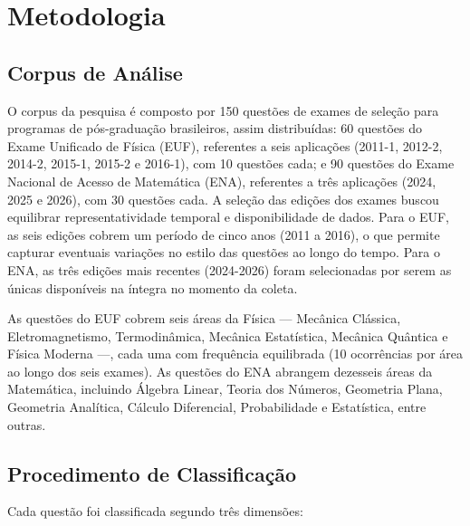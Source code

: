 \documentclass[
  12pt,
  a4paper,
  twoside,
  brazilian
]{article}
\begin{document}
\newpage
\section{Metodologia}\label{metodologia}

\subsection{Corpus de Análise}\label{corpus-de-anuxe1lise}

O corpus da pesquisa é composto por 150 questões de exames de seleção
para programas de pós-graduação brasileiros, assim distribuídas: 60
questões do Exame Unificado de Física (EUF), referentes a seis
aplicações (2011-1, 2012-2, 2014-2, 2015-1, 2015-2 e 2016-1), com 10
questões cada; e 90 questões do Exame Nacional de Acesso de Matemática
(ENA), referentes a três aplicações (2024, 2025 e 2026), com 30 questões
cada. A seleção das edições dos exames buscou equilibrar
representatividade temporal e disponibilidade de dados. Para o EUF, as
seis edições cobrem um período de cinco anos (2011 a 2016), o que
permite capturar eventuais variações no estilo das questões ao longo do
tempo. Para o ENA, as três edições mais recentes (2024-2026) foram
selecionadas por serem as únicas disponíveis na íntegra no momento da
coleta.

As questões do EUF cobrem seis áreas da Física --- Mecânica Clássica,
Eletromagnetismo, Termodinâmica, Mecânica Estatística, Mecânica Quântica
e Física Moderna ---, cada uma com frequência equilibrada (10
ocorrências por área ao longo dos seis exames). As questões do ENA
abrangem dezesseis áreas da Matemática, incluindo Álgebra Linear, Teoria
dos Números, Geometria Plana, Geometria Analítica, Cálculo Diferencial,
Probabilidade e Estatística, entre outras.

\subsection{Procedimento de
Classificação}\label{procedimento-de-classificauxe7uxe3o}

Cada questão foi classificada segundo três dimensões:
\end{document}

